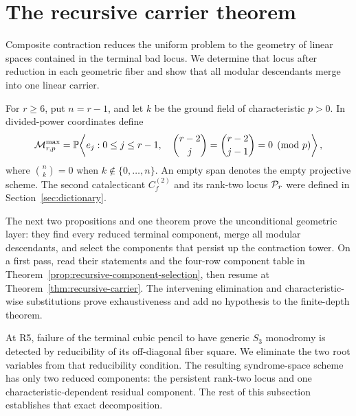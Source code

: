 \section{The recursive carrier theorem}\label{sec:recursive-carriers}

Composite contraction reduces the uniform problem to the geometry of linear
spaces contained in the terminal bad locus.  We determine that locus after
reduction in each geometric fiber and show that all modular descendants merge
into one linear carrier.

For \(r\geq6\), put \(n=r-1\), and let \(k\) be the ground field of
characteristic \(p>0\).  In divided-power coordinates define
\begin{equation}\label{eq:maximal-lucas-carrier}
 \mathcal M^{\max}_{r,p}=
 \mathbb P\!\left\langle e_j:
 0\leq j\leq r-1,\quad
 \binom{r-2}{j}=\binom{r-2}{j-1}=0\pmod p\right\rangle ,
\end{equation}
where \(\binom nk=0\) when \(k\notin\{0,\ldots,n\}\).
An empty span denotes the empty projective scheme.  The second catalecticant
\(C_f^{(2)}\) and its rank-two locus \(\mathcal P_r\) were defined in
Section~\ref{sec:dictionary}.

The next two propositions and one theorem prove the unconditional geometric
layer: they find every reduced terminal component, merge all modular
descendants, and select the components that persist up the contraction tower.
On a first pass, read their statements and the four-row component table in
Theorem~\ref{prop:recursive-component-selection}, then resume at
Theorem~\ref{thm:recursive-carrier}.  The intervening elimination and
characteristic-wise substitutions prove exhaustiveness and add no hypothesis
to the finite-depth theorem.

At R5, failure of the terminal cubic pencil to have generic \(S_3\) monodromy
is detected by reducibility of its off-diagonal fiber square.  We eliminate
the two root variables from that reducibility condition.  The resulting
syndrome-space scheme has only two reduced components: the persistent
rank-two locus and one characteristic-dependent residual component.  The rest
of this subsection establishes that exact decomposition.

